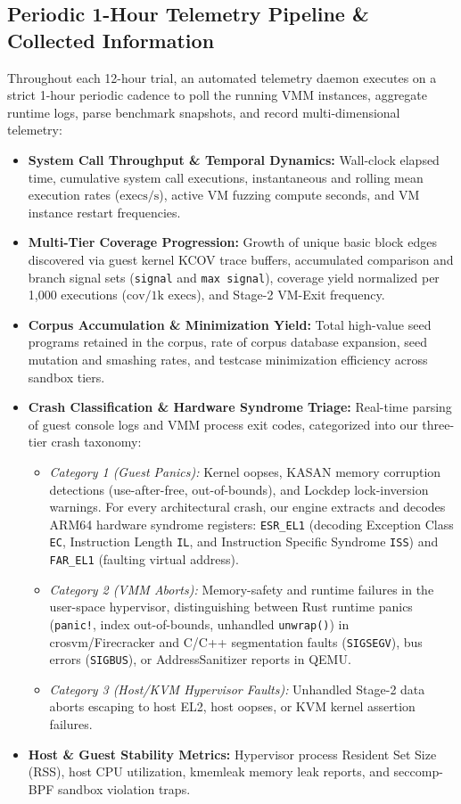 \documentclass{article}
\begin{document}
\subsection{Periodic 1-Hour Telemetry Pipeline \& Collected Information}\label{sec:telemetry_pipeline}
Throughout each 12-hour trial, an automated telemetry daemon executes on a strict 1-hour periodic cadence to poll the running VMM instances, aggregate runtime logs, parse benchmark snapshots, and record multi-dimensional telemetry:
\begin{itemize}[leftmargin=*]
    \item \textbf{System Call Throughput \& Temporal Dynamics:} Wall-clock elapsed time, cumulative system call executions, instantaneous and rolling mean execution rates ($\text{execs/s}$), active VM fuzzing compute seconds, and VM instance restart frequencies.
    \item \textbf{Multi-Tier Coverage Progression:} Growth of unique basic block edges discovered via guest kernel KCOV trace buffers, accumulated comparison and branch signal sets (\texttt{signal} and \texttt{max signal}), coverage yield normalized per 1,000 executions ($\text{cov}/1\text{k execs}$), and Stage-2 VM-Exit frequency.
    \item \textbf{Corpus Accumulation \& Minimization Yield:} Total high-value seed programs retained in the corpus, rate of corpus database expansion, seed mutation and smashing rates, and testcase minimization efficiency across sandbox tiers.
    \item \textbf{Crash Classification \& Hardware Syndrome Triage:} Real-time parsing of guest console logs and VMM process exit codes, categorized into our three-tier crash taxonomy:
    \begin{itemize}
        \item \emph{Category 1 (Guest Panics):} Kernel oopses, KASAN memory corruption detections (use-after-free, out-of-bounds), and Lockdep lock-inversion warnings. For every architectural crash, our engine extracts and decodes ARM64 hardware syndrome registers: \texttt{ESR\_EL1} (decoding Exception Class \texttt{EC}, Instruction Length \texttt{IL}, and Instruction Specific Syndrome \texttt{ISS}) and \texttt{FAR\_EL1} (faulting virtual address).
        \item \emph{Category 2 (VMM Aborts):} Memory-safety and runtime failures in the user-space hypervisor, distinguishing between Rust runtime panics (\texttt{panic!}, index out-of-bounds, unhandled \texttt{unwrap()}) in crosvm/Firecracker and C/C++ segmentation faults (\texttt{SIGSEGV}), bus errors (\texttt{SIGBUS}), or AddressSanitizer reports in QEMU.
        \item \emph{Category 3 (Host/KVM Hypervisor Faults):} Unhandled Stage-2 data aborts escaping to host EL2, host oopses, or KVM kernel assertion failures.
    \end{itemize}
    \item \textbf{Host \& Guest Stability Metrics:} Hypervisor process Resident Set Size (RSS), host CPU utilization, kmemleak memory leak reports, and seccomp-BPF sandbox violation traps.
\end{itemize}
\end{document}
